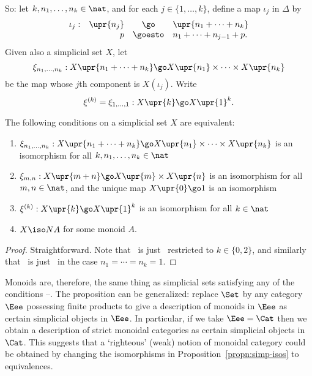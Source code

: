 So: let $k, n_1, \ldots, n_k \in \nat$, and for each $j\in \{ 1, \ldots, k
\}$, define a map $\iota_j$ in $\Delta$ by 
\[
\begin{array}{rrcl}
\iota_j: 	&\upr{n_j}	&\go		&\upr{n_1 + \cdots + n_k}\\
		&p		&\goesto	&n_1 + \cdots + n_{j-1} + p.
\end{array}
\]
Given also a simplicial set $X$, let%
%
%
\[
\xi_{n_1, \ldots, n_k}: 
X\upr{n_1 + \cdots + n_k} 
\go 
X\upr{n_1} \times\cdots\times X\upr{n_k}
\]
be the map whose $j$th component is $X(\iota_j)$.  Write
\[
\xi^{(k)} = \xi_{1, \ldots, 1} : X\upr{k} \go X\upr{1}^k.
\]
%
\begin{propn}	
The following conditions on a simplicial set $X$ are equivalent:
%
\begin{enumerate}
\item	{}
$\xi_{n_1, \ldots, n_k}: 
X\upr{n_1 + \cdots + n_k} 
\go 
X\upr{n_1} \times\cdots\times X\upr{n_k}$
is an isomorphism for all $k, n_1, \ldots, n_k \in \nat$
\item 	{}
$\xi_{m,n}: X\upr{m+n} \go X\upr{m} \times X\upr{n}$
is an isomorphism for all $m, n \in \nat$, and the unique map $X\upr{0} \go
1$ is an isomorphism
\item 	{}
$\xi^{(k)}: X\upr{k} \go X\upr{1}^k$
is an isomorphism for all $k\in\nat$
\item 	{}
$X \iso NA$ for some monoid $A$.
\end{enumerate}
\end{propn}

\begin{proof} 
Straightforward.  Note that~ is
just~ restricted to $k\in\{0,2\}$, and
similarly that~ is
just~ in the case $n_1 = \cdots = n_k = 1$.
\done
\end{proof}

Monoids are, therefore, the same thing as simplicial sets satisfying any of
the conditions --.
The proposition can be generalized: replace $\Set$ by any category $\Eee$
possessing finite products to give a description of monoids in $\Eee$ as
certain simplicial objects in $\Eee$.  In particular, if we take
$\Eee=\Cat$ then we obtain a description of strict monoidal categories as
certain simplicial objects in $\Cat$.  This suggests that a `righteous'
(weak)%
%
%
notion of monoidal category could be obtained by changing the
isomorphisms in Proposition~\ref{propn:simp-isos} to equivalences.

